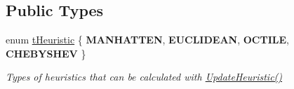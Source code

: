\subsection*{Public Types}
\begin{DoxyCompactItemize}
\item 
\mbox{\label{classplanner_1_1c_planner_a7f6dc4cbb69dd1ede14a67b0a7bd425b}} 
enum \mbox{\hyperlink{classplanner_1_1c_planner_a7f6dc4cbb69dd1ede14a67b0a7bd425b}{t\+Heuristic}} \{ {\bfseries M\+A\+N\+H\+A\+T\+T\+EN}, 
{\bfseries E\+U\+C\+L\+I\+D\+E\+AN}, 
{\bfseries O\+C\+T\+I\+LE}, 
{\bfseries C\+H\+E\+B\+Y\+S\+H\+EV}
 \}
\begin{DoxyCompactList}\small\item\em Types of heuristics that can be calculated with \mbox{\hyperlink{classplanner_1_1c_planner_ab7cc7c2666de2e49f745901080aac147}{Update\+Heuristic()}} \end{DoxyCompactList}\end{DoxyCompactItemize}
